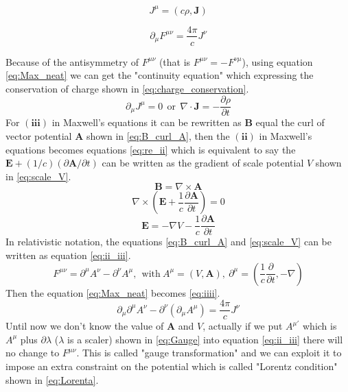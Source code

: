 \begin{equation}
J^{\mu}=(c\rho,\mathbf{J})
\label{eq:J_mu}
\end{equation}

\begin{equation}
\partial_{\mu}F^{\mu\nu}=\frac{4\pi}{c}J^{\nu}
\label{eq:Max_neat}
\end{equation}

Because of the antisymmetry of $F^{\mu\nu}$ (that is $F^{\mu\nu}=-F^{\nu\mu}$), using equation \ref{eq:Max_neat} we can get the "continuity equation" which expressing the conservation of charge shown in \ref{eq:charge_conservation}.
\begin{equation}
\partial_{\mu}J^{\mu}=0~~\mathrm{or}~~\nabla\cdot\mathbf{J}=-\frac{\partial\rho}{\partial t}
\label{eq:charge_conservation}
\end{equation}
For $(\mathbf{iii})$ in Maxwell's equations it can be rewritten as $\mathbf{B}$ equal the curl of vector potential $\mathbf{A}$ shown in \ref{eq:B_curl_A}, then the $(\mathbf{ii})$ in Maxwell's equations becomes equations \ref{eq:re_ii} which is equivalent to say the $\mathbf{E}+(1/c)(\partial\mathbf{A}/\partial t)$ can be written as the gradient of scale potential $V$ shown in \ref{eq:scale_V}.
\begin{equation}
\mathbf{B}=\nabla\times\mathbf{A}
\label{eq:B_curl_A}
\end{equation}
\begin{equation}
\nabla\times(\mathbf{E}+\frac{1}{c}\frac{\partial\mathbf{A}}{\partial t})=0
\label{eq:re_ii}
\end{equation}
\begin{equation}
\mathbf{E}=-\nabla V-\frac{1}{c}\frac{\partial\mathbf{A}}{\partial t}
\label{eq:scale_V}
\end{equation}
In relativistic notation, the equations \ref{eq:B_curl_A} and \ref{eq:scale_V} can be written as equation \ref{eq:ii_iii}.
\begin{equation}
F^{\mu\nu}=\partial^{\mu}A^{\nu}-\partial^{\nu}A^{\mu},~~\mathrm{with}~A^{\mu}=(V,\mathbf{A}),~\partial^{\mu}=(\frac{1}{c}\frac{\partial}{\partial t},-\nabla)
\label{eq:ii_iii}
\end{equation}
Then the equation \ref{eq:Max_neat} becomes \ref{eq:iiii}.
\begin{equation}
\partial_{\mu}\partial^{\mu}A^{\nu}-\partial^{\nu}(\partial_{\mu}A^{\mu})=\frac{4\pi}{c}J^{\nu}
\label{eq:iiii}
\end{equation}
Until now we don't know the value of $\mathbf{A}$ and $V$, actually if we put $A^{\mu'}$ which is $A^{\mu}$ plus $\partial\lambda$ ($\lambda$ is a scaler) shown in \ref{eq:Gauge} into equation \ref{eq:ii_iii} there will no change to $F^{\mu\nu}$. This is called "gauge transformation" and we can exploit it to impose an extra constraint on the potential which is called "Lorentz condition" shown in \ref{eq:Lorenta}.
